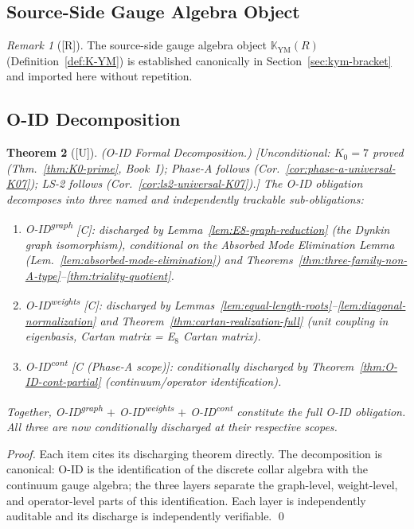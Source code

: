 \documentclass[12pt,oneside]{amsbook}
\theoremstyle{plain}
\newtheorem{theorem}{Theorem}[section]
\theoremstyle{definition}
\theoremstyle{remark}
\newtheorem{remark}[theorem]{Remark}
\newcommand{\status}[1]{\textup{[#1]}}
\begin{document}
\subsection{Source-Side Gauge Algebra Object}

\begin{remark}[\status{R}]
The source-side gauge algebra object $\mathbb{K}_{\mathrm{YM}}(R)$
(Definition~\ref{def:K-YM}) is established canonically in
Section~\ref{sec:kym-bracket} and imported here without repetition.
\end{remark}

\subsection{O-ID Decomposition}

\begin{theorem}[\status{U}]\label{thm:O-ID-decomposition}
\textup{(O-ID Formal Decomposition.)}
\textup{[Unconditional: $K_0=7$ proved (Thm.~\ref{thm:K0-prime}, Book~I); Phase-A follows (Cor.~\ref{cor:phase-a-universal-K07}); LS-2 follows (Cor.~\ref{cor:ls2-universal-K07}).]}
The O-ID obligation decomposes into three named and independently
trackable sub-obligations:
\begin{enumerate}[label=\textup{(\arabic*)}]
 \item \textup{O-ID\textsuperscript{graph}} [C]: discharged by
 Lemma~\ref{lem:E8-graph-reduction} (the Dynkin graph isomorphism),
 conditional on the Absorbed Mode Elimination Lemma
 (Lem.~\ref{lem:absorbed-mode-elimination}) and
 Theorems~\ref{thm:three-family-non-A-type}--\ref{thm:triality-quotient}.
 \item \textup{O-ID\textsuperscript{weights}} [C]: discharged by
 Lemmas~\ref{lem:equal-length-roots}--\ref{lem:diagonal-normalization}
 and Theorem~\ref{thm:cartan-realization-full} (unit coupling in
 eigenbasis, Cartan matrix = E$_8$ Cartan matrix).
 \item \textup{O-ID\textsuperscript{cont}} [C (Phase-A scope)]:
 conditionally discharged by
 Theorem~\ref{thm:O-ID-cont-partial} (continuum/operator identification).
\end{enumerate}
Together, O-ID\textsuperscript{graph} $+$ O-ID\textsuperscript{weights}
$+$ O-ID\textsuperscript{cont} constitute the full O-ID obligation.
All three are now conditionally discharged at their respective scopes.
\end{theorem}

\begin{proof}
Each item cites its discharging theorem directly. The decomposition
is canonical: O-ID is the identification of the discrete collar
algebra with the continuum gauge algebra; the three layers separate
the graph-level, weight-level, and operator-level parts of this
identification. Each layer is independently auditable and its
discharge is independently verifiable. \qed
\end{proof}
\end{document}
